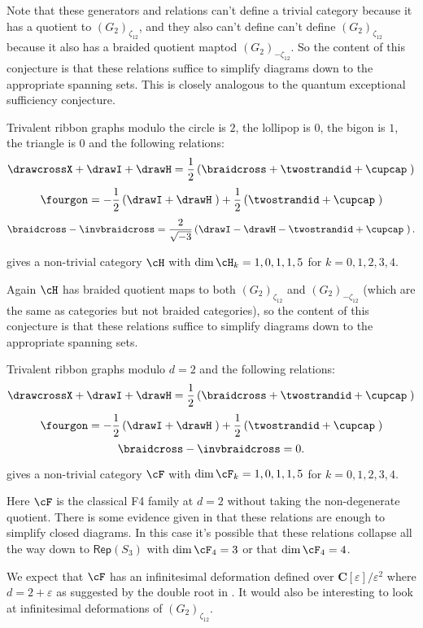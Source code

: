 \documentclass[12pt]{amsart}
\begin{document}
Note that these generators and relations can't define a trivial category
because it has a quotient to  $(G_2)_{\zeta_{12}}$, and they also can't define
can't define $(G_2)_{\zeta_{12}}$ because it also has a braided quotient maptod $(G_2)_{-\zeta_{12}}$.  So the content of this conjecture
is that these relations suffice to simplify diagrams down to the appropriate
spanning sets.  This is closely analogous to the quantum exceptional sufficiency conjecture.

\begin{conjecture}
Trivalent ribbon graphs modulo the circle is $2$, the lollipop is $0$, the bigon is $1$, the triangle is $0$ and the following relations:
$$\drawcrossX + \drawI + \drawH = \frac{1}{2} \left(\braidcross + \twostrandid + \cupcap \;\right)$$
$$\fourgon = -\frac{1}{2} \left(\drawI + \drawH \;\right) + \frac{1}{2} \left(\twostrandid + \cupcap\;\right)$$
$$\braidcross - \invbraidcross = \frac{2}{\sqrt{-3}} \left(\drawI - \drawH - \twostrandid + \cupcap\;\right).$$

gives a non-trivial category $\cH$ with $\dim \cH_k = 1,0,1,1,5$ for $k = 0,1,2,3,4$.  
\end{conjecture}

Again $\cH$ has braided quotient maps to both $(G_2)_{\zeta_{12}}$ and
$(G_2)_{-\zeta_{12}}$ (which are the same as categories but not braided
categories), so the content of this conjecture is that these relations suffice
to simplify diagrams down to the appropriate spanning sets.

\begin{conjecture}
Trivalent ribbon graphs modulo $d=2$ and the following relations:
$$\drawcrossX + \drawI + \drawH = \frac{1}{2} \left(\braidcross + \twostrandid + \cupcap \;\right)$$
$$\fourgon = -\frac{1}{2} \left(\drawI + \drawH \;\right) + \frac{1}{2} \left(\twostrandid + \cupcap\;\right)$$
$$\braidcross - \invbraidcross = 0.$$

gives a non-trivial category $\cF$ with $\dim \cF_k = 1,0,1,1,5$ for $k = 0,1,2,3,4$.
\end{conjecture}

Here $\cF$ is the classical F4 family at $d=2$ without taking the 
non-degenerate quotient.  There is some evidence given in \cite{F4E6} that these
relations are enough to simplify closed diagrams.  In this case it's possible
that these relations collapse all the way down to $\mathsf{Rep}(S_3)$ with
$\dim \cF_4 = 3$ or that $\dim \cF_4 = 4$.

\begin{remark}
We expect that $\cF$ has an infinitesimal deformation defined over
$\mathbf{C}[\varepsilon]/\varepsilon^2$ where $d = 2+\varepsilon$ as suggested
by the double root in \cite[p. 3]{F4E6}.  It would also be interesting to look at infinitesimal deformations of $(G_2)_{\zeta_{12}}$.
\end{remark}
\end{document}
